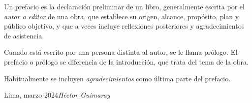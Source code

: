 %
%

\preface

Un prefacio es la declaración preliminar de un libro,
generalmente escrita por el \textit{autor o editor} de una obra, que
establece su origen, alcance, propósito, plan y público objetivo, y que
a veces incluye reflexiones posteriores y agradecimientos de asistencia.

Cuando está escrito por una persona distinta al autor, se le llama prólogo.
El prefacio o prólogo se diferencia de la introducción, que trata del
tema de la obra.

Habitualmente se incluyen \textit{agradecimientos} como última parte
del prefacio.

\vspace{\baselineskip}
\begin{flushright}\noindent
    Lima, marzo 2024\hfill {\it Héctor  Guimaray}
\end{flushright}